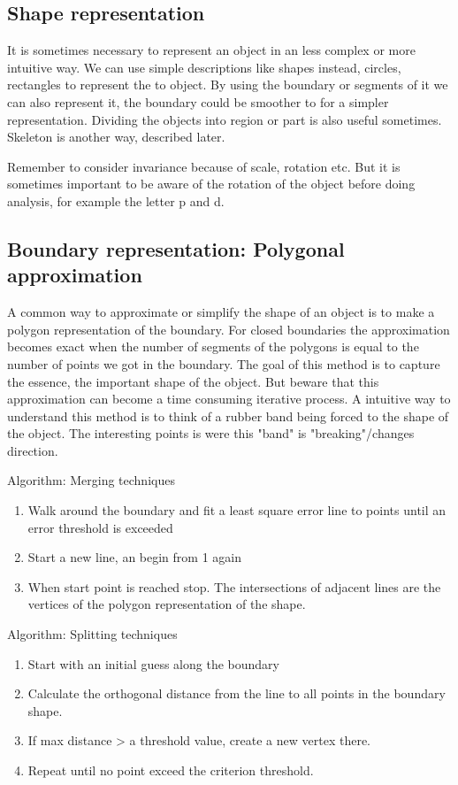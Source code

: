 \subsection*{Shape representation}
It is sometimes necessary to represent an object in an less complex or more intuitive way. We can use simple descriptions like shapes instead, circles, rectangles to represent the to object. By using the boundary or segments of it we can also represent it, the boundary could be smoother to for a simpler representation. Dividing the objects into region or part is also useful sometimes. Skeleton is another way, described later.


Remember to consider invariance because of scale, rotation etc. But it is sometimes important to be aware of the rotation of the object before doing analysis, for example the letter p and d.

\subsection*{Boundary representation: Polygonal approximation}
A common way to approximate or simplify the shape of an object is to make a polygon representation of the boundary. For closed boundaries the approximation becomes exact when the number of segments of the polygons is equal to the number of points we got in the boundary. The goal of this method is to capture the essence, the important shape of the object. But beware that this approximation can become a time consuming iterative process. A intuitive way to understand this method is to think of a rubber band being forced to the shape of the object. The interesting points is were this "band" is "breaking"/changes direction.  

\begin{definition}{Algorithm: Merging techniques}
\begin{enumerate}
	\item Walk around the boundary and fit a least square error line to points until an error threshold is exceeded
	\item Start a new line, an begin from 1 again
	\item When start point is reached stop. The intersections of adjacent lines are the vertices of the polygon representation of the shape. 
\end{enumerate}
\end{definition}


\begin{definition}{Algorithm: Splitting techniques}
\begin{enumerate}
	\item Start with an initial guess along the boundary
	\item Calculate the orthogonal distance from the line to all points in the boundary shape. 
	\item If max distance > a threshold value, create a new vertex there. 
	\item Repeat until no point exceed the criterion threshold. 
\end{enumerate}
\end{definition}



